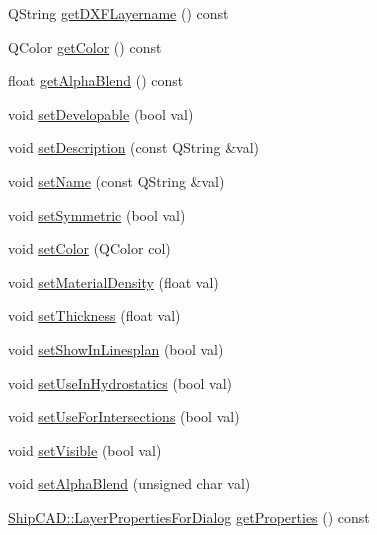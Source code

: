 \begin{DoxyCompactItemize}
\item 
Q\+String \hyperlink{classShipCAD_1_1SubdivisionLayer_a7fec6b5a8b2b4a82bd4e85e164ac138c}{get\+D\+X\+F\+Layername} () const 
\item 
Q\+Color \hyperlink{classShipCAD_1_1SubdivisionLayer_a42268e80d68448cdcfc12d1c06f20229}{get\+Color} () const 
\item 
float \hyperlink{classShipCAD_1_1SubdivisionLayer_aa39b9fb93cf15b8b9dc726f178ee9081}{get\+Alpha\+Blend} () const 
\item 
void \hyperlink{classShipCAD_1_1SubdivisionLayer_a6fdfc0d208904d821349eb7380a52411}{set\+Developable} (bool val)
\item 
void \hyperlink{classShipCAD_1_1SubdivisionLayer_af6c25ed582173a904496f0dc7a45d725}{set\+Description} (const Q\+String \&val)
\item 
void \hyperlink{classShipCAD_1_1SubdivisionLayer_a3861c77aeb283fbea6efe943ced83f41}{set\+Name} (const Q\+String \&val)
\item 
void \hyperlink{classShipCAD_1_1SubdivisionLayer_ab3c7c5072ba6cd411404651e8e0dca2f}{set\+Symmetric} (bool val)
\item 
void \hyperlink{classShipCAD_1_1SubdivisionLayer_a5494031433242c810e6e307bfef33e6d}{set\+Color} (Q\+Color col)
\item 
void \hyperlink{classShipCAD_1_1SubdivisionLayer_a4f65806f7c1a42e3a54ed13722790432}{set\+Material\+Density} (float val)
\item 
void \hyperlink{classShipCAD_1_1SubdivisionLayer_a992e177c7a4b468ab2e3549e44661f3a}{set\+Thickness} (float val)
\item 
void \hyperlink{classShipCAD_1_1SubdivisionLayer_aa58323da0043db61eaa87672755e96d2}{set\+Show\+In\+Linesplan} (bool val)
\item 
void \hyperlink{classShipCAD_1_1SubdivisionLayer_a88897eeb2b600169ca110fc4ec4aef08}{set\+Use\+In\+Hydrostatics} (bool val)
\item 
void \hyperlink{classShipCAD_1_1SubdivisionLayer_aef63325b0ef8b700b96a7cd97c501936}{set\+Use\+For\+Intersections} (bool val)
\item 
void \hyperlink{classShipCAD_1_1SubdivisionLayer_a979723de5c5cf0f4ecea8a5f9d0968d7}{set\+Visible} (bool val)
\item 
void \hyperlink{classShipCAD_1_1SubdivisionLayer_a066c619a1925ab25ecf068764e4df97c}{set\+Alpha\+Blend} (unsigned char val)
\item 
\hyperlink{structShipCAD_1_1LayerPropertiesForDialog}{Ship\+C\+A\+D\+::\+Layer\+Properties\+For\+Dialog} \hyperlink{classShipCAD_1_1SubdivisionLayer_aa3f5427f8d5dc40964721acf840b2e24}{get\+Properties} () const 

\end{DoxyCompactItemize}
